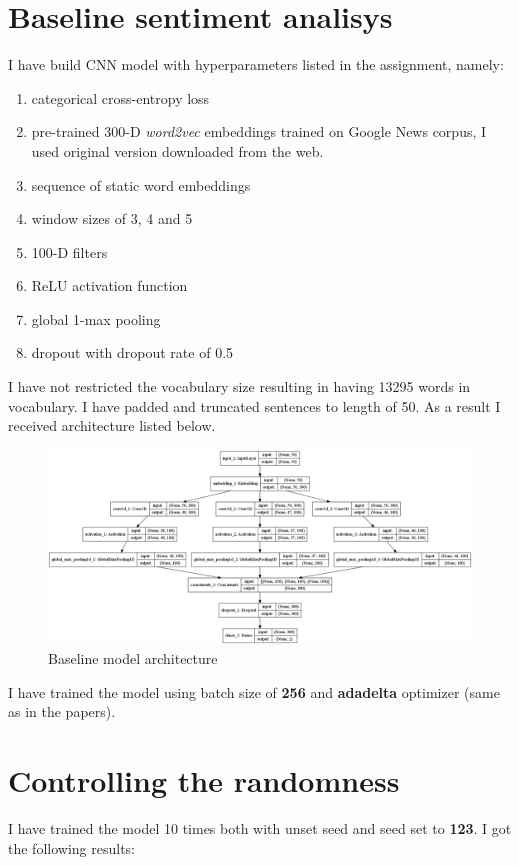 \documentclass{article}
\begin{document}
\section{Baseline sentiment analisys}
I have build CNN model with hyperparameters listed in the assignment, namely:
\begin{enumerate}
    \item categorical cross-entropy loss
    \item pre-trained 300-D \textit{word2vec} embeddings trained on Google News corpus,
    I used original version downloaded from the web.
    \item sequence of static word embeddings
    \item window sizes of 3, 4 and 5
    \item 100-D filters
    \item ReLU activation function
    \item global 1-max pooling
    \item dropout with dropout rate of 0.5
\end{enumerate}
I have not restricted the vocabulary size resulting in having 13295 words in vocabulary.
I have padded and truncated sentences to length of 50. As a result I received architecture listed below.
\newpage
\begin{figure}[h]
    \centering
    \includegraphics[width=1\textwidth]{../figures/baseline.png}
    \caption{Baseline model architecture}
\end{figure}
I have trained the model using batch size of \textbf{256} and \textbf{adadelta} optimizer 
(same as in the papers).
\section{Controlling the randomness}
I have trained the model 10 times both with unset seed and seed set to \textbf{123}. I got
the following results:
\begin{figure}[h]
    \centering
    
\end{figure}
\end{document}
